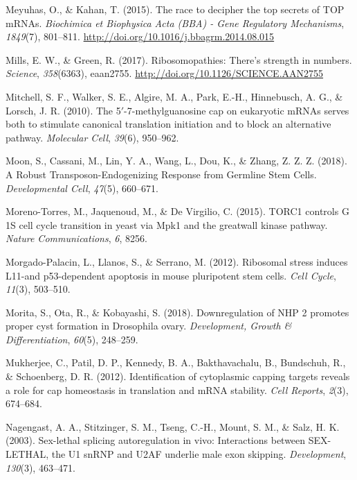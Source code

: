 \documentclass[12pt,twoside]{reedthesis}
\newlength{\cslhangindent}
\newenvironment{cslreferences}%
  {\setlength{\parindent}{0pt}%
  \everypar{\setlength{\hangindent}{\cslhangindent}}\ignorespaces}%
  {\par}
\begin{document}
\begin{cslreferences}
\leavevmode\hypertarget{ref-meyuhasRaceDecipherTop2015}{}%
Meyuhas, O., \& Kahan, T. (2015). The race to decipher the top secrets of TOP mRNAs. \emph{Biochimica et Biophysica Acta (BBA) - Gene Regulatory Mechanisms}, \emph{1849}(7), 801--811. \url{http://doi.org/10.1016/j.bbagrm.2014.08.015}

\leavevmode\hypertarget{ref-Mills2017c}{}%
Mills, E. W., \& Green, R. (2017). Ribosomopathies: There's strength in numbers. \emph{Science}, \emph{358}(6363), eaan2755. \url{http://doi.org/10.1126/SCIENCE.AAN2755}

\leavevmode\hypertarget{ref-Mitchell2010}{}%
Mitchell, S. F., Walker, S. E., Algire, M. A., Park, E.-H., Hinnebusch, A. G., \& Lorsch, J. R. (2010). The 5\({'}\)-7-methylguanosine cap on eukaryotic mRNAs serves both to stimulate canonical translation initiation and to block an alternative pathway. \emph{Molecular Cell}, \emph{39}(6), 950--962.

\leavevmode\hypertarget{ref-Moon2018a}{}%
Moon, S., Cassani, M., Lin, Y. A., Wang, L., Dou, K., \& Zhang, Z. Z. Z. (2018). A Robust Transposon-Endogenizing Response from Germline Stem Cells. \emph{Developmental Cell}, \emph{47}(5), 660--671.

\leavevmode\hypertarget{ref-Moreno-Torres2015}{}%
Moreno-Torres, M., Jaquenoud, M., \& De Virgilio, C. (2015). TORC1 controls G 1S cell cycle transition in yeast via Mpk1 and the greatwall kinase pathway. \emph{Nature Communications}, \emph{6}, 8256.

\leavevmode\hypertarget{ref-Morgado-Palacin2012a}{}%
Morgado-Palacin, L., Llanos, S., \& Serrano, M. (2012). Ribosomal stress induces L11-and p53-dependent apoptosis in mouse pluripotent stem cells. \emph{Cell Cycle}, \emph{11}(3), 503--510.

\leavevmode\hypertarget{ref-Morita2018}{}%
Morita, S., Ota, R., \& Kobayashi, S. (2018). Downregulation of NHP 2 promotes proper cyst formation in Drosophila ovary. \emph{Development, Growth \& Differentiation}, \emph{60}(5), 248--259.

\leavevmode\hypertarget{ref-Mukherjee2012}{}%
Mukherjee, C., Patil, D. P., Kennedy, B. A., Bakthavachalu, B., Bundschuh, R., \& Schoenberg, D. R. (2012). Identification of cytoplasmic capping targets reveals a role for cap homeostasis in translation and mRNA stability. \emph{Cell Reports}, \emph{2}(3), 674--684.

\leavevmode\hypertarget{ref-Nagengast2003}{}%
Nagengast, A. A., Stitzinger, S. M., Tseng, C.-H., Mount, S. M., \& Salz, H. K. (2003). Sex-lethal splicing autoregulation in vivo: Interactions between SEX-LETHAL, the U1 snRNP and U2AF underlie male exon skipping. \emph{Development}, \emph{130}(3), 463--471.


\end{cslreferences}
\end{document}
